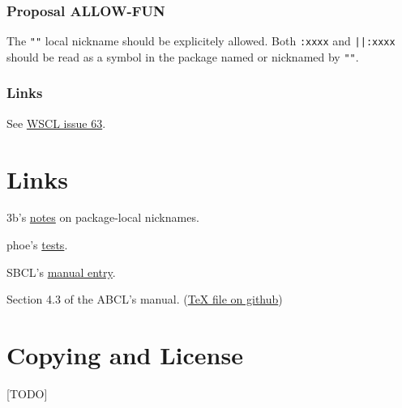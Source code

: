 \documentclass[11pt]{article}
\begin{document}
\subsubsection{Proposal ALLOW-FUN}
\label{sec:org70bd308}
The \texttt{""} local nickname should be explicitely allowed. Both \texttt{:xxxx} and \texttt{||:xxxx}
should be read as a symbol in the package named or nicknamed by \texttt{""}.
\subsubsection{Links}
\label{sec:org660fe67}
See \href{https://github.com/s-expressionists/wscl/issues/63}{WSCL issue 63}.
\section{Links}
\label{sec:org7f37578}
3b's \href{https://github.com/3b/package-local-nicknames/blob/master/docs.org}{notes} on package-local nicknames.

phoe's \href{https://github.com/phoe/trivial-package-local-nicknames}{tests}.

SBCL's \href{https://www.sbcl.org/manual/\#Package\_002dLocal-Nicknames}{manual entry}.

Section 4.3 of the ABCL's manual. (\href{https://github.com/armedbear/abcl/blob/master/doc/manual/abcl.tex\#L1249}{\TeX{} file on github})
\section{Copying and License}
\label{sec:orgc258bbc}
[TODO]
\end{document}

